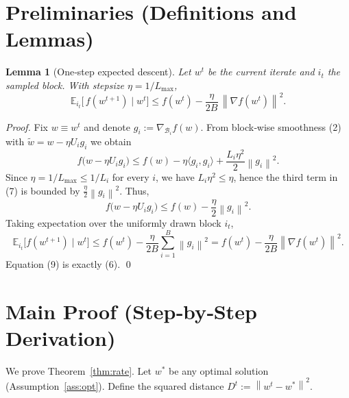 \documentclass[11pt]{article}
\newtheorem{lemma}{Lemma}
\newcommand{\E}{\mathbb{E}}
\newcommand{\norm}[1]{\left\|#1\right\|}
\begin{document}
\section*{Preliminaries (Definitions and Lemmas)}
\begin{lemma}[One‑step expected descent]\label{lem:descent}
Let $w^{t}$ be the current iterate and $i_{t}$ the sampled block.
With stepsize $\eta=1/L_{\max}$,
\[
\E_{i_{t}}\!\bigl[\,f(w^{t+1})\mid w^{t}\bigr]
\le f(w^{t})-\frac{\eta}{2B}\,\norm{\nabla f(w^{t})}^{2}.
\tag{6}
\]
\end{lemma}
\begin{proof}
Fix $w\equiv w^{t}$ and denote $g_{i}:=\nabla_{\mathcal{B}_{i}} f(w)$.
From block‑wise smoothness (2) with $\tilde w = w -\eta U_{i}g_{i}$ we obtain
\[
f\bigl(w-\eta U_{i}g_{i}\bigr)
\le f(w)-\eta\langle g_{i},g_{i}\rangle
+\frac{L_{i}\eta^{2}}{2}\norm{g_{i}}^{2}.
\tag{7}
\]
Since $\eta=1/L_{\max}\le 1/L_{i}$ for every $i$, we have $L_{i}\eta^{2}\le\eta$,
hence the third term in (7) is bounded by $\frac{\eta}{2}\norm{g_{i}}^{2}$.
Thus,
\[
f\bigl(w-\eta U_{i}g_{i}\bigr)
\le f(w)-\frac{\eta}{2}\norm{g_{i}}^{2}.
\tag{8}
\]
Taking expectation over the uniformly drawn block $i_{t}$,
\[
\E_{i_{t}}\!\bigl[f(w^{t+1})\mid w^{t}\bigr]
\le f(w^{t})-\frac{\eta}{2B}\sum_{i=1}^{B}\norm{g_{i}}^{2}
= f(w^{t})-\frac{\eta}{2B}\norm{\nabla f(w^{t})}^{2}.
\tag{9}
\]
Equation (9) is exactly (6). \hfill\qed
\end{proof}

\section*{Main Proof (Step‑by‑Step Derivation)}
We prove Theorem~\ref{thm:rate}.  
Let $w^{*}$ be any optimal solution (Assumption~\ref{ass:opt}).  
Define the squared distance $D^{t}:=\norm{w^{t}-w^{*}}^{2}$.
\end{document}
